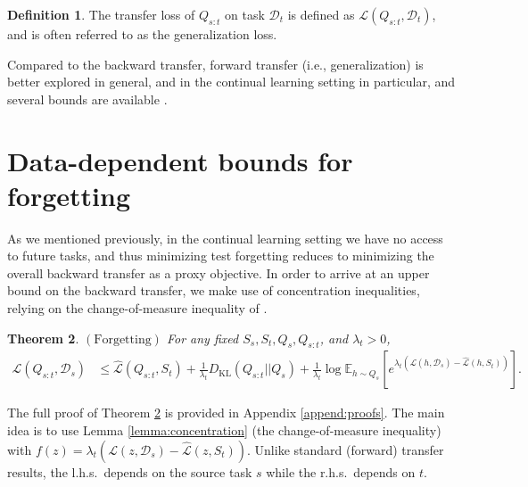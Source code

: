 \documentclass{article}
\theoremstyle{plain}
\newtheorem{theorem}{Theorem}[section]
\theoremstyle{definition}
\newtheorem{definition}[theorem]{Definition}
\theoremstyle{remark}
\begin{document}
%
\begin{definition}
    The transfer loss of $Q_{s:t}$ on task $\mathcal{D}_t$ is defined as $\mathcal{L}(Q_{s:t}, \mathcal{D}_t)$, and is often referred to as the generalization loss.
\end{definition}

Compared to the backward transfer, forward transfer (i.e., generalization) is better explored in general, and in the continual learning setting in particular, and several bounds are available \cite{bennani2020generalisation, benavides2022theory}. 
\section{Data-dependent bounds for forgetting}\label{sec:data-dep-bounds}

As we mentioned previously, in the continual learning setting we have no access to future tasks, and thus minimizing test forgetting reduces to minimizing the overall backward transfer as a proxy objective.
In order to arrive at an upper bound on the backward transfer, we make use of concentration inequalities, relying on the change-of-measure inequality of \citet{donsker1975large}.
%
%
\begin{theorem} \label{thm:forget-base2} $\mathrm{(Forgetting)}$
    For any fixed $S_s,S_t,Q_s,Q_{s:t}$, and $
    \lambda_t>0$, 
    \begin{align} \label{eq:forget-base2}
\mathcal{L}(Q_{s:t}, \mathcal{D}_s) &\leq \hat{\mathcal{L}}(Q_{s:t}, S_t) + \frac{1}{\lambda_t} D_{\mathrm{KL}}(Q_{s:t}||Q_{s})
+\frac{1}{\lambda_t}\log\mathbb{E}_{h\sim Q_{s}}\left [e^{\lambda_t(\mathcal{L}(h,\mathcal{D}_s)-\hat{\mathcal{L}}(h,S_t))} \right ].
\end{align}
\end{theorem}
The full proof of Theorem \ref{thm:forget-base2} is provided in Appendix \ref{append:proofs}. 
The main idea is to use Lemma \ref{lemma:concentration} (the change-of-measure inequality) with $f(z)=\lambda_t(\mathcal{L}(z,\mathcal{D}_s)-\hat{\mathcal{L}}(z,S_t))$.
Unlike standard (forward) transfer results, the l.h.s.\ depends on the source task $s$ while the r.h.s.\ depends on $t$.
\end{document}
